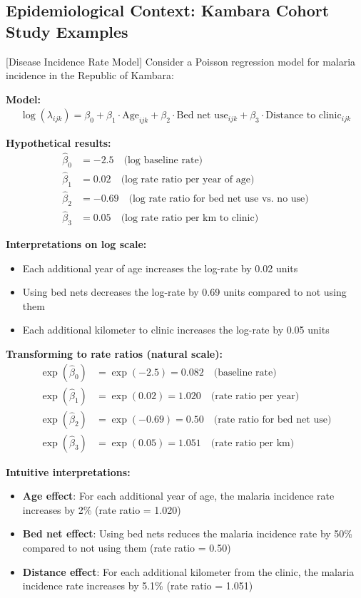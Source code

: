 \documentclass{article}
\begin{document}
\subsection{Epidemiological Context: Kambara Cohort Study Examples}

[Disease Incidence Rate Model]
Consider a Poisson regression model for malaria incidence in the Republic of Kambara:

\textbf{Model:}
\begin{align}
\log(\lambda_{ijk}) = \beta_0 + \beta_1 \cdot \text{Age}_{ijk} + \beta_2 \cdot \text{Bed net use}_{ijk} + \beta_3 \cdot \text{Distance to clinic}_{ijk}
\end{align}

\textbf{Hypothetical results:}
\begin{align}
\hat{\beta}_0 &= -2.5 \quad \text{(log baseline rate)} \\
\hat{\beta}_1 &= 0.02 \quad \text{(log rate ratio per year of age)} \\
\hat{\beta}_2 &= -0.69 \quad \text{(log rate ratio for bed net use vs. no use)} \\
\hat{\beta}_3 &= 0.05 \quad \text{(log rate ratio per km to clinic)}
\end{align}

\textbf{Interpretations on log scale:}
\begin{itemize}
    \item Each additional year of age increases the log-rate by 0.02 units
    \item Using bed nets decreases the log-rate by 0.69 units compared to not using them
    \item Each additional kilometer to clinic increases the log-rate by 0.05 units
\end{itemize}

\textbf{Transforming to rate ratios (natural scale):}
\begin{align}
\exp(\hat{\beta}_0) &= \exp(-2.5) = 0.082 \quad \text{(baseline rate)} \\
\exp(\hat{\beta}_1) &= \exp(0.02) = 1.020 \quad \text{(rate ratio per year)} \\
\exp(\hat{\beta}_2) &= \exp(-0.69) = 0.50 \quad \text{(rate ratio for bed net use)} \\
\exp(\hat{\beta}_3) &= \exp(0.05) = 1.051 \quad \text{(rate ratio per km)}
\end{align}

\textbf{Intuitive interpretations:}
\begin{itemize}
    \item \textbf{Age effect}: For each additional year of age, the malaria incidence rate increases by 2\% (rate ratio = 1.020)
    \item \textbf{Bed net effect}: Using bed nets reduces the malaria incidence rate by 50\% compared to not using them (rate ratio = 0.50)
    \item \textbf{Distance effect}: For each additional kilometer from the clinic, the malaria incidence rate increases by 5.1\% (rate ratio = 1.051)
\end{itemize}
\end{document}
